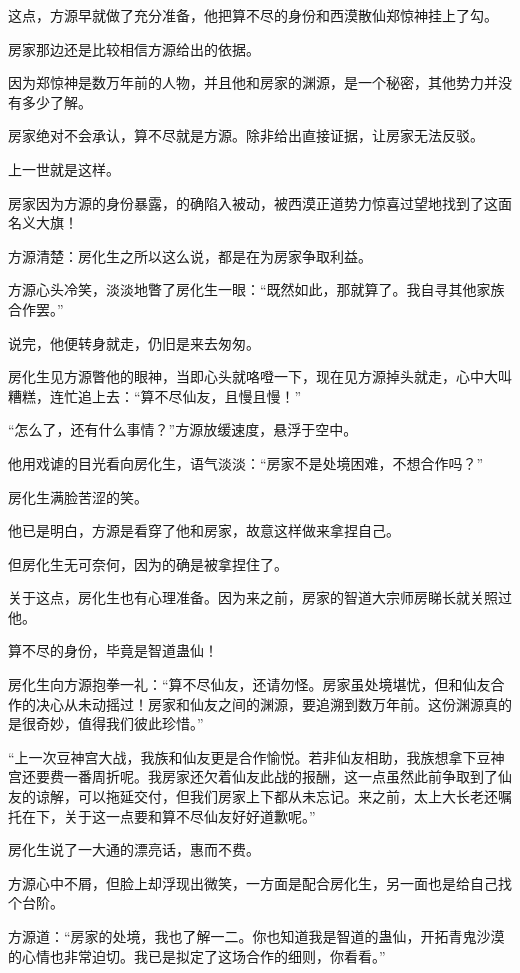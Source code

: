 \begin{this_body}
这点，方源早就做了充分准备，他把算不尽的身份和西漠散仙郑惊神挂上了勾。

房家那边还是比较相信方源给出的依据。

因为郑惊神是数万年前的人物，并且他和房家的渊源，是一个秘密，其他势力并没有多少了解。

房家绝对不会承认，算不尽就是方源。除非给出直接证据，让房家无法反驳。

上一世就是这样。

房家因为方源的身份暴露，的确陷入被动，被西漠正道势力惊喜过望地找到了这面名义大旗！

方源清楚：房化生之所以这么说，都是在为房家争取利益。

方源心头冷笑，淡淡地瞥了房化生一眼：“既然如此，那就算了。我自寻其他家族合作罢。”

说完，他便转身就走，仍旧是来去匆匆。

房化生见方源瞥他的眼神，当即心头就咯噔一下，现在见方源掉头就走，心中大叫糟糕，连忙追上去：“算不尽仙友，且慢且慢！”

“怎么了，还有什么事情？”方源放缓速度，悬浮于空中。

他用戏谑的目光看向房化生，语气淡淡：“房家不是处境困难，不想合作吗？”

房化生满脸苦涩的笑。

他已是明白，方源是看穿了他和房家，故意这样做来拿捏自己。

但房化生无可奈何，因为的确是被拿捏住了。

关于这点，房化生也有心理准备。因为来之前，房家的智道大宗师房睇长就关照过他。

算不尽的身份，毕竟是智道蛊仙！

房化生向方源抱拳一礼：“算不尽仙友，还请勿怪。房家虽处境堪忧，但和仙友合作的决心从未动摇过！房家和仙友之间的渊源，要追溯到数万年前。这份渊源真的是很奇妙，值得我们彼此珍惜。”

“上一次豆神宫大战，我族和仙友更是合作愉悦。若非仙友相助，我族想拿下豆神宫还要费一番周折呢。我房家还欠着仙友此战的报酬，这一点虽然此前争取到了仙友的谅解，可以拖延交付，但我们房家上下都从未忘记。来之前，太上大长老还嘱托在下，关于这一点要和算不尽仙友好好道歉呢。”

房化生说了一大通的漂亮话，惠而不费。

方源心中不屑，但脸上却浮现出微笑，一方面是配合房化生，另一面也是给自己找个台阶。

方源道：“房家的处境，我也了解一二。你也知道我是智道的蛊仙，开拓青鬼沙漠的心情也非常迫切。我已是拟定了这场合作的细则，你看看。”


\end{this_body}
